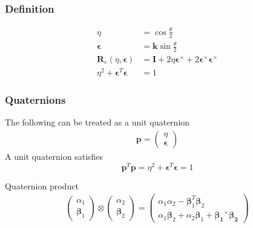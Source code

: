 \subsubsection{Definition}
\begin{align*}
    \eta &= \cos\frac{\theta}{2} \\
    \bm{\epsilon} &= \bm{k}\sin\frac{\theta}{2} \\
    \bm{R}_e(\eta,\bm{\epsilon}) &= \bm{I} + 2\eta\bm{\epsilon}^\times + 2\bm{\epsilon}^\times\bm{\epsilon}^\times \\
    \eta^2 + \bm{\epsilon}^T\bm{\epsilon} &= 1
\end{align*}

%

\setcounter{subsubsection}{2}
\subsubsection{Quaternions}

The following can be treated as a unit quaternion
\begin{align*}
    \bm{p} = \begin{pmatrix}\eta \\ \bm{\epsilon}\end{pmatrix}
\end{align*}
A unit quaternion satisfies
\[\bm{p}^T\bm{p} = \eta^2 + \bm{\epsilon}^T\bm{\epsilon} = 1\]

Quaternion product
\begin{align*}
    \begin{pmatrix}\alpha_1 \\ \bm{\beta}_1\end{pmatrix} \otimes \begin{pmatrix}\alpha_2 \\ \bm{\beta}_2\end{pmatrix} = 
        \begin{pmatrix}\alpha_1\alpha_2-\bm{\beta}_1^T\bm{\beta}_2 \\ \alpha_1\bm{\beta}_2+\alpha_2\bm{\beta}_1 + \bm{\beta_1}^\times\bm{\beta_2}\end{pmatrix}
\end{align*}

\setcounter{subsubsection}{5}
